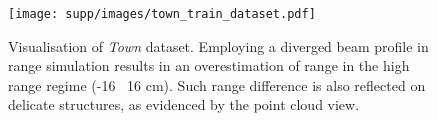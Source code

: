 \begin{figure}[t]
\centering
\texttt{[image: supp/images/town\_train\_dataset.pdf]}

\caption{Visualisation of \textit{Town} dataset. Employing a diverged beam profile in range simulation results in an overestimation of range in the high range regime (-16 \bwr~16 cm). Such range difference is also reflected on delicate structures, as evidenced by the point cloud view.}
\label{fig:iccv_supp_town_dataset}

\end{figure}
